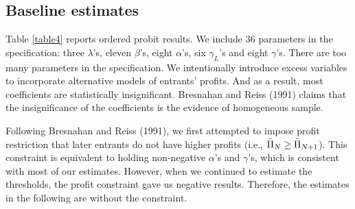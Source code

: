 \documentclass[a4paper,11pt]{article}
\begin{document}
\subsection{Baseline estimates}

Table \ref{table4} reports ordered probit results. We include 36 parameters in the specification: three $\lambda$'s, eleven $\beta$'s, eight $\alpha$'s, six $\gamma_L$'s and eight $\gamma$'s. There are too many parameters in the specification. We intentionally introduce excess variables to incorporate alternative models of entrants' profits. And as a result, most coefficients are statistically insignificant. Bresnahan and Reiss (1991) claims that the insignificance of the coefficients is the evidence of homogeneous sample. 

Following Bresnahan and Reiss (1991), we first attempted to impose profit restriction that later entrants do not have higher profits (i.e., $\Bar{\Pi}_N\ge \Bar{\Pi}_{N+1}$). This constraint is equivalent to holding non-negative $\alpha$'s and $\gamma$'s, which is consistent with most of our estimates. However, when we continued to estimate the thresholds, the profit constraint gave us negative results. Therefore, the estimates in the following are without the constraint. 
\end{document}
